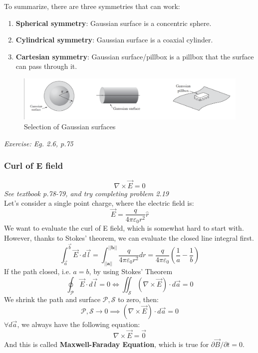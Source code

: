 \documentclass[12pt,a4paper,twoside]{article}
\begin{document}
    To summarize, there are three symmetries that can work:
    \begin{enumerate}
        \item \textbf{Spherical symmetry}: Gaussian surface is a concentric sphere.
        \item \textbf{Cylindrical symmetry}: Gaussian surface is a coaxial cylinder.
        \item \textbf{Cartesian symmetry}: Gaussian surface/pillbox is a pillbox that the surface can pass through it.
    \end{enumerate}
    \begin{figure}[ht]
        \centering
        \includegraphics[width=15cm]{250-Revision/gaussian-surfaces.png}
        \caption{Selection of Gaussian surfaces}
        \label{fig:gaussian-surfaces}
    \end{figure}
    \textit{Exercise: Eg. 2.6, p.75}
    
\subsubsection{Curl of E field}
    \[\nabla \times \overrightarrow{E}=0\]
    \textit{See textbook p.78-79, and try completing problem 2.19}\\
    Let's consider a single point charge, where the electric field is:
    \[\overrightarrow{E}=\frac{q}{4\pi\varepsilon_0r^2}\hat{r}\]
    We want to evaluate the curl of E field, which is somewhat hard to start with. However, thanks to Stokes' theorem, we can evaluate the closed line integral first.
    \[\int_{\overrightarrow{a}}^{\overrightarrow{b}}\overrightarrow{E}\cdot d\overrightarrow{l}=\int_{||\mathbf{a}||}^{||\mathbf{b}||}\frac{q}{4\pi\varepsilon_0 r^2}dr=\frac{q}{4\pi\varepsilon_0}\left(\frac{1}{a}-\frac{1}{b}\right)\]
    If the path closed, i.e. $a=b$, by using Stokes' Theorem
    \[\oint_{\mathcal{P}}\overrightarrow{E}\cdot d\overrightarrow{l}=0\iff \iint_{\mathcal{S}}(\nabla\times \overrightarrow{E})\cdot d\overrightarrow{a}=0\]
    We shrink the path and surface $\mathcal{P}, \mathcal{S}$ to zero, then:
    \[\mathcal{P},\mathcal{S}\to 0\implies (\nabla \times \overrightarrow{E})\cdot d\overrightarrow{a}=0\]
    $\forall d\overrightarrow{a}$,  we always have the following equation:
    \begin{equation}
        \nabla \times \overrightarrow{E} = \overrightarrow{0}
        \label{eq: Maxwell-Faraday equation}
    \end{equation}
    And this is called \textbf{Maxwell-Faraday Equation}, which is true for $\partial \overrightarrow{B}/\partial t=0$.
\end{document}
